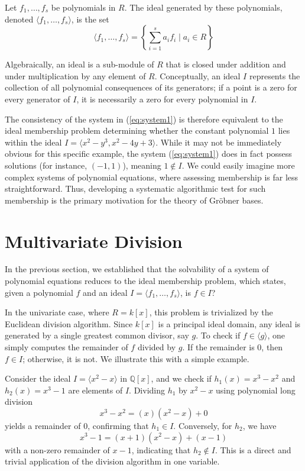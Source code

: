\begin{definition}[Ideal]
\label{def:ideal}
Let $f_1, \dots, f_s$ be polynomials in $R$. The ideal generated by these polynomials, denoted $\langle f_1, \dots, f_s \rangle$, is the set
$$
\langle f_1, \dots, f_s \rangle = \left\{ \sum_{i=1}^{s} a_i f_i \mid a_i \in R \right\}
$$
\end{definition}

Algebraically, an ideal is a sub-module of $R$ that is closed under addition and under multiplication by any element of $R$. Conceptually, an ideal $I$ represents the collection of all polynomial consequences of its generators; if a point is a zero for every generator of $I$, it is necessarily a zero for every polynomial in $I$.

The consistency of the system in (\ref{eq:system1}) is therefore equivalent to the ideal membership problem determining whether the constant polynomial $1$ lies within the ideal $I = \langle x^{2} - y^{3}, x^{2} - 4y + 3 \rangle$. While it may not be immediately obvious for this specific example, the system (\ref{eq:system1}) does in fact possess solutions (for instance, $(-1, 1)$), meaning $1 \notin I$. We could easily imagine more complex systems of polynomial equations, where assessing membership is far less straightforward. Thus, developing a systematic algorithmic test for such membership is the primary motivation for the theory of Gröbner bases.

\section{Multivariate Division}

In the previous section, we established that the solvability of a system of polynomial equations reduces to the ideal membership problem, which states, given a polynomial $f$ and an ideal $I = \langle f_1, \dots, f_s \rangle$, is $f \in I$?

In the univariate case, where $R = k[x]$, this problem is trivialized by the Euclidean division algorithm. Since $k[x]$ is a principal ideal domain, any ideal is generated by a single greatest common divisor, say $g$. To check if $f \in \langle g \rangle$, one simply computes the remainder of $f$ divided by $g$. If the remainder is $0$, then $f \in I$; otherwise, it is not. We illustrate this with a simple example.

\begin{example}
\label{ex:univar_membership}
Consider the ideal $I = \langle x^2 - x \rangle$ in $\mathbb{Q}[x]$, and we check if $h_1(x) = x^3 - x^2$ and $h_2(x) = x^3 - 1$ are elements of $I$. Dividing $h_1$ by $x^2 - x$ using polynomial long division 
$$
x^3 - x^2 = (x)(x^2 - x) + 0
$$
yields a remainder of $0$, confirming that $h_1 \in I$. Conversely, for $h_2$, we have
$$
x^3 - 1 = (x + 1)(x^2 - x) + (x - 1)
$$
with a non-zero remainder of $x - 1$, indicating that $h_2 \notin I$. This is a direct and trivial application of the division algorithm in one variable.
\end{example}

